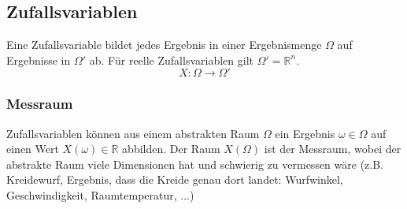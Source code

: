 \subsection{Zufallsvariablen}
\begin{emphbox}
    Eine Zufallsvariable bildet jedes Ergebnis in einer Ergebnismenge $\Omega$ auf Ergebnisse in $\Omega'$ ab.
    Für reelle Zufallsvariablen gilt $\Omega'=\mathbb R^n$.
    \begin{equation*}
        X : \Omega \rightarrow \Omega'
    \end{equation*}
\end{emphbox}

\begin{sectionbox}
    \subsubsection{Messraum}
    Zufallsvariablen können aus einem abstrakten Raum $\Omega$ ein Ergebnis $\omega\in\Omega$ auf einen Wert $X(\omega)\in\mathbb R$ abbilden.
    Der Raum $X(\Omega)$ ist der Messraum, wobei der abstrakte Raum viele Dimensionen hat und schwierig zu vermessen wäre (z.B. Kreidewurf, Ergebnis, dass die Kreide genau dort landet: Wurfwinkel, Geschwindigkeit, Raumtemperatur, ...)
\end{sectionbox}